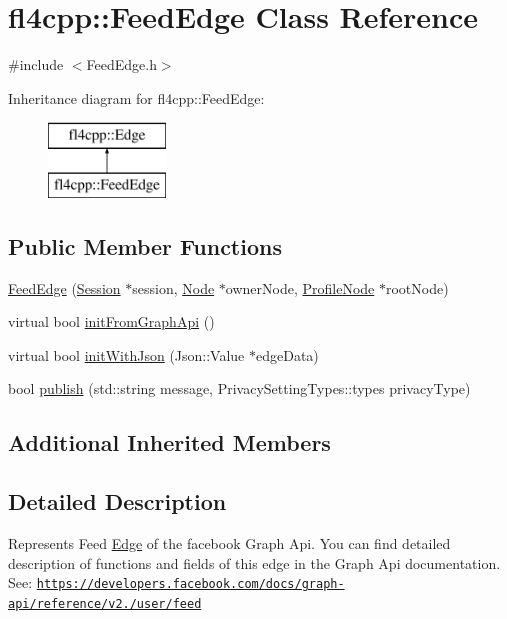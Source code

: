 \hypertarget{classfl4cpp_1_1_feed_edge}{}\section{fl4cpp\+:\+:Feed\+Edge Class Reference}
\label{classfl4cpp_1_1_feed_edge}


{\ttfamily \#include $<$Feed\+Edge.\+h$>$}

Inheritance diagram for fl4cpp\+:\+:Feed\+Edge\+:\begin{figure}[H]
\begin{center}
\leavevmode
\includegraphics[height=2.000000cm]{classfl4cpp_1_1_feed_edge}
\end{center}
\end{figure}
\subsection*{Public Member Functions}
\begin{DoxyCompactItemize}
\item 
\hyperlink{classfl4cpp_1_1_feed_edge_a553d364cfd8e396cac259677c249338a}{Feed\+Edge} (\hyperlink{classfl4cpp_1_1_session}{Session} $\ast$session, \hyperlink{classfl4cpp_1_1_node}{Node} $\ast$owner\+Node, \hyperlink{classfl4cpp_1_1_profile_node}{Profile\+Node} $\ast$root\+Node)
\item 
virtual bool \hyperlink{classfl4cpp_1_1_feed_edge_a144ad6fb33f0f41a31b7f5e6612dcc1e}{init\+From\+Graph\+Api} ()
\item 
virtual bool \hyperlink{classfl4cpp_1_1_feed_edge_ad91cbc78cf5c7bd48c3d8e4c4acac38f}{init\+With\+Json} (Json\+::\+Value $\ast$edge\+Data)
\item 
bool \hyperlink{classfl4cpp_1_1_feed_edge_a6cf4b9ae1525eca0424fc6f101ad3122}{publish} (std\+::string message, Privacy\+Setting\+Types\+::types privacy\+Type)
\end{DoxyCompactItemize}
\subsection*{Additional Inherited Members}


\subsection{Detailed Description}
Represents Feed \hyperlink{classfl4cpp_1_1_edge}{Edge} of the facebook Graph Api. You can find detailed description of functions and fields of this edge in the Graph Api documentation. See\+: \href{https://developers.facebook.com/docs/graph-api/reference/v2.0/user/feed}{\tt https\+://developers.\+facebook.\+com/docs/graph-\/api/reference/v2./user/feed} 

